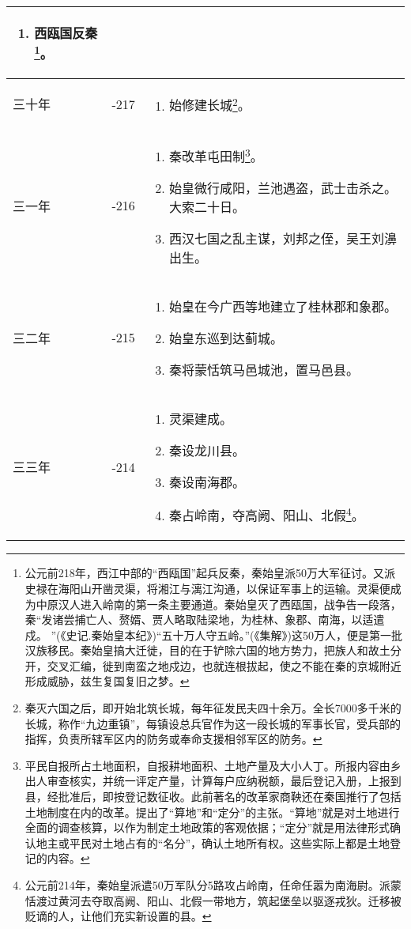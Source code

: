 \begin{longtable}{|>{\centering\scriptsize}m{2em}|>{\centering\scriptsize}m{1.3em}|>{\centering}m{8.8em}|}
\begin{enumerate}
  \item 西瓯国反秦\footnote{公元前218年，西江中部的“西瓯国”起兵反秦，秦始皇派50万大军征讨。又派史禄在海阳山开凿灵渠，将湘江与漓江沟通，以保证军事上的运输。灵渠便成为中原汉人进入岭南的第一条主要通道。秦始皇灭了西瓯国，战争告一段落，秦“发诸尝捕亡人、赘婿、贾人略取陆梁地，为桂林、象郡、南海，以适遣戍。 ”(《史记.秦始皇本纪》)“五十万人守五岭。”(《集解》)这50万人，便是第一批汉族移民。秦始皇搞大迁徙，目的在于铲除六国的地方势力，把族人和故土分开，交叉汇编，徙到南蛮之地戍边，也就连根拔起，使之不能在秦的京城附近形成威胁，兹生复国复旧之梦。}。
  \end{enumerate} \tabularnewline\hline
  三十年 & -217 & \begin{enumerate}
    \tiny
  \item 始修建长城\footnote{秦灭六国之后，即开始北筑长城，每年征发民夫四十余万。全长7000多千米的长城，称作“九边重镇”，每镇设总兵官作为这一段长城的军事长官，受兵部的指挥，负责所辖军区内的防务或奉命支援相邻军区的防务。}。
  \end{enumerate} \tabularnewline\hline
  三一年 & -216 & \begin{enumerate}
    \tiny
  \item 秦改革屯田制\footnote{平民自报所占土地面积，自报耕地面积、土地产量及大小人丁。所报内容由乡出人审查核实，并统一评定产量，计算每户应纳税额，最后登记入册，上报到县，经批准后，即按登记数征收。此前著名的改革家商鞅还在秦国推行了包括土地制度在内的改革。提出了“算地”和“定分”的主张。“算地”就是对土地进行全面的调查核算，以作为制定土地政策的客观依据；“定分”就是用法律形式确认地主或平民对土地占有的“名分”，确认土地所有权。这些实际上都是土地登记的内容。}。
  \item 始皇微行咸阳，兰池遇盗，武士击杀之。大索二十日。
  \item 西汉七国之乱主谋，刘邦之侄，吴王刘濞出生。
  \end{enumerate} \tabularnewline\hline
  三二年 & -215 & \begin{enumerate}
    \tiny
  \item 始皇在今广西等地建立了桂林郡和象郡。
  \item 始皇东巡到达蓟城。
  \item 秦将蒙恬筑马邑城池，置马邑县。
  \end{enumerate} \tabularnewline\hline
  三三年 & -214 & \begin{enumerate}
    \tiny
  \item 灵渠建成。
  \item 秦设龙川县。
  \item 秦设南海郡。
  \item 秦占岭南，夺高阙、阳山、北假\footnote{公元前214年，秦始皇派遣50万军队分5路攻占岭南，任命任嚣为南海尉。派蒙恬渡过黄河去夺取高阙、阳山、北假一带地方，筑起堡垒以驱逐戎狄。迁移被贬谪的人，让他们充实新设置的县。}。

\end{enumerate}
\end{longtable}
